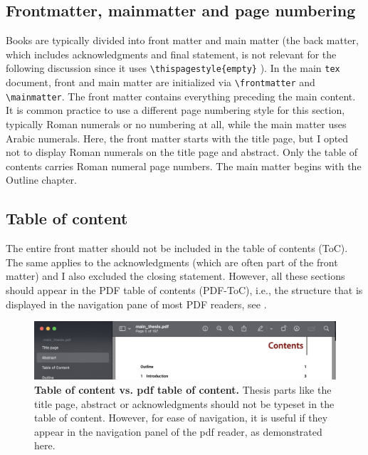 \subsection{Frontmatter, mainmatter and page numbering}
Books are typically divided into front matter and main matter (the back matter, which includes acknowledgments and final statement, is not relevant for the following discussion since it uses \verb|\thispagestyle{empty}|
). In the main \verb|tex| document, front and main matter are initialized via \verb|\frontmatter| and \verb|\mainmatter|. The front matter contains everything preceding the main content. It is common practice to use a different page numbering style for this section, typically Roman numerals or no numbering at all, while the main matter uses Arabic numerals.
Here, the front matter starts with the title page, but I opted not to display Roman numerals on the title page and abstract. Only the table of contents carries Roman numeral page numbers. The main matter begins with the Outline chapter. 

\subsection{Table of content}
The entire front matter should not be included in the table of contents (ToC). The same applies to the acknowledgments (which are often part of the front matter) and I also excluded the closing statement. However, all these sections should appear in the PDF table of contents (PDF-ToC), i.e., the structure that is displayed in the navigation pane of most PDF readers, see .

\begin{figure}
	\includegraphics[width = \textwidth]{pdf-toc.png}
	\caption{\textbf{Table of content vs. pdf table of content.} Thesis parts like the title page, abstract or acknowledgments should not be typeset in the table of content. However, for ease of navigation, it is useful if they appear in the navigation panel of the pdf reader, as demonstrated here.}
	\label{fig:pdf-toc}
\end{figure}

